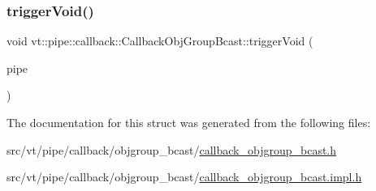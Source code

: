 \mbox{\label{structvt_1_1pipe_1_1callback_1_1_callback_obj_group_bcast_ab1a7563aa18693946506a66506f94671}} 
\subsubsection{\texorpdfstring{trigger\+Void()}{triggerVoid()}}
{\footnotesize\ttfamily void vt\+::pipe\+::callback\+::\+Callback\+Obj\+Group\+Bcast\+::trigger\+Void (\begin{DoxyParamCaption}\item[{\hyperlink{namespacevt_ac9852acda74d1896f48f406cd72c7bd3}{Pipe\+Type} const \&}]{pipe }\end{DoxyParamCaption})\hspace{0.3cm}{\ttfamily [inline]}}



The documentation for this struct was generated from the following files\+:\begin{DoxyCompactItemize}
\item 
src/vt/pipe/callback/objgroup\+\_\+bcast/\hyperlink{callback__objgroup__bcast_8h}{callback\+\_\+objgroup\+\_\+bcast.\+h}\item 
src/vt/pipe/callback/objgroup\+\_\+bcast/\hyperlink{callback__objgroup__bcast_8impl_8h}{callback\+\_\+objgroup\+\_\+bcast.\+impl.\+h}\end{DoxyCompactItemize}
